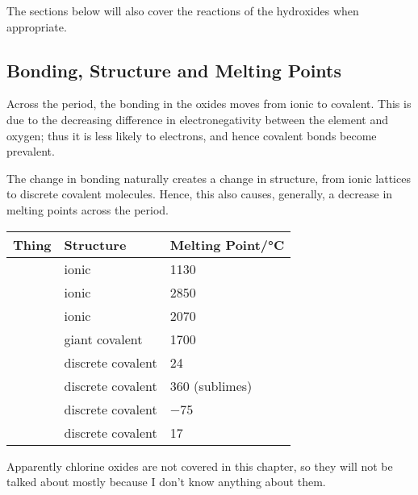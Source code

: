 		The sections below will also cover the reactions of the hydroxides when appropriate.

		\subsection{Bonding, Structure and Melting Points}

			Across the period, the bonding in the oxides moves from ionic to covalent. This is due to the decreasing difference
			in electronegativity between the element and oxygen; thus it is less likely to  electrons, and hence
			covalent bonds become prevalent.

			The change in bonding naturally creates a change in structure, from ionic lattices to discrete covalent molecules. Hence, this
			also causes, generally, a decrease in melting points across the period.

			\begin{center}\begin{table}[htb]\renewcommand{\arraystretch}{1.5}
			\begin{tabu} to \textwidth {X[c,m] | X[c,m] | X[c,m]}

				Thing		&	Structure			&	Melting Point/\si{\celsius}	\\ \hline
					&	ionic				&	\num{1130}					\\ \hline
					&	ionic				&	\num{2850}					\\ \hline
					&	ionic				&	\num{2070}					\\ \hline
					&	giant covalent		&	\num{1700}					\\ \hline
					&	discrete covalent	&	\num{24}					\\ \hline
					&	discrete covalent	&	\num{360} (sublimes)		\\ \hline
					&	discrete covalent	&	\num{-75}					\\ \hline
					&	discrete covalent	&	\num{17}					\\ \hline

			\end{tabu}
			\end{table}\end{center}\vspace{-10mm}

			Apparently chlorine oxides are not covered in this chapter, so they will not be talked about mostly because I don't know
			anything about them.

